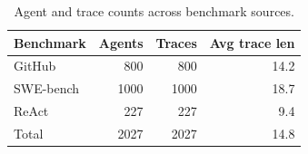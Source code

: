 \begin{table}[t]
\centering\small\setlength{\tabcolsep}{6pt}
\begin{tabular}{lrrr}
\toprule
Benchmark & Agents & Traces & Avg trace len \\
\midrule
GitHub & 800 & 800 & 14.2 \\
SWE-bench & 1000 & 1000 & 18.7 \\
ReAct & 227 & 227 & 9.4 \\
\midrule
Total & 2027 & 2027 & 14.8 \\
\bottomrule
\end{tabular}
\caption{Agent and trace counts across benchmark sources.}
\label{tab:benchmarks}
\end{table}